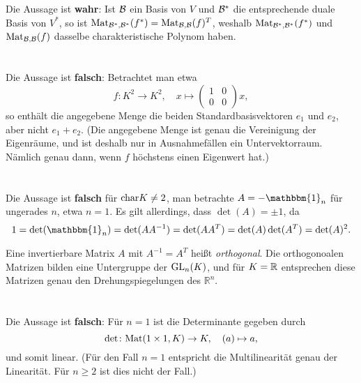 \documentclass[a4paper,10pt]{article}
\begin{document}
\section{}
Die Aussage ist \textbf{wahr}: Ist $\mathcal{B}$ ein Basis von $V$ und $\mathcal{B}^*$ die entsprechende duale Basis von $V^*$, so ist $\mathrm{Mat}_{\mathcal{B}^*,\mathcal{B}^*}(f^*) = \mathrm{Mat}_{\mathcal{B},\mathcal{B}}(f)^T$, weshalb $\mathrm{Mat}_{\mathcal{B}^*,\mathcal{B}^*}(f^*)$ und $\mathrm{Mat}_{\mathcal{B},\mathcal{B}}(f)$ dasselbe charakteristische Polynom haben.





\section{}
Die Aussage ist \textbf{falsch}: Betrachtet man etwa
\[
 f \colon K^2 \to K^2, \quad x \mapsto \begin{pmatrix} 1 & 0 \\ 0 & 0 \end{pmatrix} x,
\]
so enthält die angegebene Menge die beiden Standardbasisvektoren $e_1$ und $e_2$, aber nicht $e_1 + e_2$. (Die angegebene Menge ist genau die Vereinigung der Eigenräume, und ist deshalb nur in Ausnahmefällen ein Untervektorraum. Nämlich genau dann, wenn $f$ höchstens einen Eigenwert hat.)





\section{}
Die Aussage ist \textbf{falsch} für $\mathrm{char} K \neq 2$, man betrachte $A = -\mathbbm{1}_n$ für ungerades $n$, etwa $n = 1$. Es gilt allerdings, dass $\det(A) = \pm 1$, da
\[
 1
 = \det(\mathbbm{1}_n)
 = \det(A A^{-1})
 = \det(A A^T)
 = \det(A) \det(A^T)
 = \det(A)^2.
\]

\begin{bem}
 Eine invertierbare Matrix $A$ mit $A^{-1} = A^T$ heißt \emph{orthogonal}. Die orthogonoalen Matrizen bilden eine Untergruppe der $\mathrm{GL}_n(K)$, und für $K = \mathbb{R}$ entsprechen diese Matrizen genau den Drehungspiegelungen des $\mathbb{R}^n$.
\end{bem}






\section{}
Die Aussage ist \textbf{falsch}: Für $n = 1$ ist die Determinante gegeben durch
\[
 \det \colon \mathrm{Mat}(1 \times 1, K) \to K, \quad (a) \mapsto a,
\]
und somit linear. (Für den Fall $n = 1$ entspricht die Multilinearität genau der Linearität. Für $n \geq 2$ ist dies nicht der Fall.)
\end{document}
